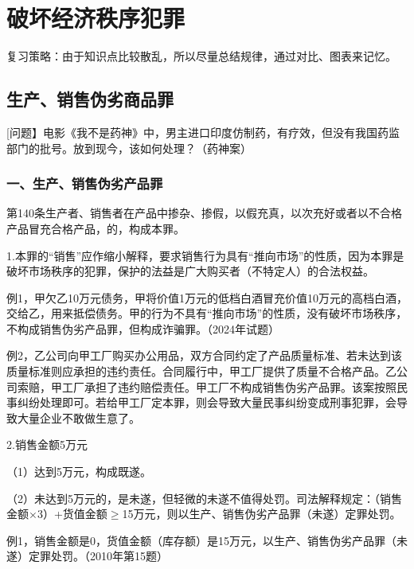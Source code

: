 \chapter{破坏经济秩序犯罪}

\begin{EditionOpeningPanel}
复习策略：由于知识点比较散乱，所以尽量总结规律，通过对比、图表来记忆。
\end{EditionOpeningPanel}

\section{生产、销售伪劣商品罪}

[问题】电影《我不是药神》中，男主进口印度仿制药，有疗效，但没有我国药监部门的批号。放到现今，该如何处理？（药神案）

\subsection*{一、生产、销售伪劣产品罪}

第140条生产者、销售者在产品中掺杂、掺假，以假充真，以次充好或者以不合格产品冒充合格产品，的，构成本罪。

1.本罪的“销售”应作缩小解释，要求销售行为具有“推向市场”的性质，因为本罪是破坏市场秩序的犯罪，保护的法益是广大购买者（不特定人）的合法权益。

例1，甲欠乙10万元债务，甲将价值1万元的低档白酒冒充价值10万元的高档白酒，交给乙，用来抵偿债务。甲的行为不具有“推向市场”的性质，没有破坏市场秩序，不构成销售伪劣产品罪，但构成诈骗罪。（2024年试题）

例2，乙公司向甲工厂购买办公用品，双方合同约定了产品质量标准、若未达到该质量标准则应承担的违约责任。合同履行中，甲工厂提供了质量不合格产品。乙公司索赔，甲工厂承担了违约赔偿责任。甲工厂不构成销售伪劣产品罪。该案按照民事纠纷处理即可。若给甲工厂定本罪，则会导致大量民事纠纷变成刑事犯罪，会导致大量企业不敢做生意了。

2.销售金额5万元

（1）达到5万元，构成既遂。

（2）未达到5万元的，是未遂，但轻微的未遂不值得处罚。司法解释规定：（销售金额\ensuremath{\times}3）+货值金额\ensuremath{\ge}15万元，则以生产、销售伪劣产品罪（未遂）定罪处罚。

例1，销售金额是0，货值金额（库存额）是15万元，以生产、销售伪劣产品罪（未遂）定罪处罚。（2010年第15题）

